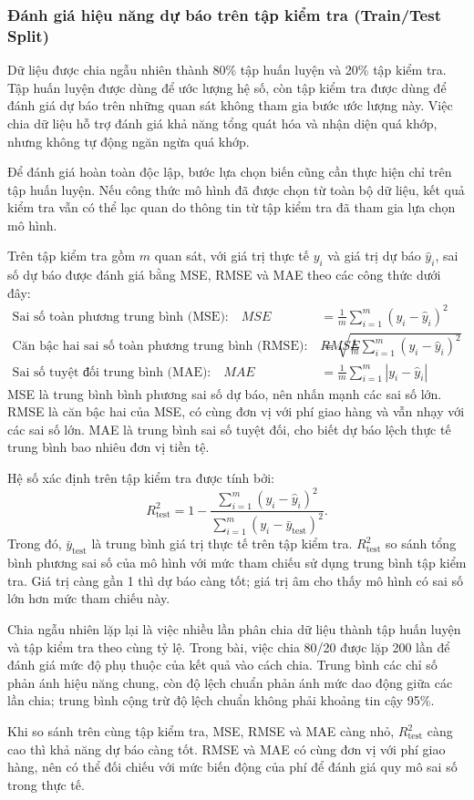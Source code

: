	\subsubsection{Đánh giá hiệu năng dự báo trên tập kiểm tra (Train/Test Split)}
	
	Dữ liệu được chia ngẫu nhiên thành 80\% tập huấn luyện và 20\% tập kiểm tra. Tập huấn luyện được dùng để ước lượng hệ số, còn tập kiểm tra được dùng để đánh giá dự báo trên những quan sát không tham gia bước ước lượng này. Việc chia dữ liệu hỗ trợ đánh giá khả năng tổng quát hóa và nhận diện quá khớp, nhưng không tự động ngăn ngừa quá khớp.
	
	Để đánh giá hoàn toàn độc lập, bước lựa chọn biến cũng cần thực hiện chỉ trên tập huấn luyện. Nếu công thức mô hình đã được chọn từ toàn bộ dữ liệu, kết quả kiểm tra vẫn có thể lạc quan do thông tin từ tập kiểm tra đã tham gia lựa chọn mô hình.
	
	Trên tập kiểm tra gồm $m$ quan sát, với giá trị thực tế $y_i$ và giá trị dự báo $\hat{y}_i$, sai số dự báo được đánh giá bằng MSE, RMSE và MAE theo các công thức dưới đây:
	\begin{align}
		\text{Sai số toàn phương trung bình (MSE):} \quad MSE &= \frac{1}{m} \sum_{i=1}^{m} (y_i - \hat{y}_i)^2 \\
		\text{Căn bậc hai sai số toàn phương trung bình (RMSE):} \quad RMSE &= \sqrt{\frac{1}{m} \sum_{i=1}^{m} (y_i - \hat{y}_i)^2} \\
		\text{Sai số tuyệt đối trung bình (MAE):} \quad MAE &= \frac{1}{m} \sum_{i=1}^{m} |y_i - \hat{y}_i|
	\end{align}
	MSE là trung bình bình phương sai số dự báo, nên nhấn mạnh các sai số lớn. RMSE là căn bậc hai của MSE, có cùng đơn vị với phí giao hàng và vẫn nhạy với các sai số lớn. MAE là trung bình sai số tuyệt đối, cho biết dự báo lệch thực tế trung bình bao nhiêu đơn vị tiền tệ.
	
	Hệ số xác định trên tập kiểm tra được tính bởi:
	\begin{equation*}
		R^2_{\text{test}} = 1 - \frac{\sum_{i=1}^{m}(y_i-\hat{y}_i)^2}{\sum_{i=1}^{m}(y_i-\bar{y}_{\text{test}})^2}.
	\end{equation*}
	Trong đó, $\bar{y}_{\text{test}}$ là trung bình giá trị thực tế trên tập kiểm tra. $R^2_{\text{test}}$ so sánh tổng bình phương sai số của mô hình với mức tham chiếu sử dụng trung bình tập kiểm tra. Giá trị càng gần 1 thì dự báo càng tốt; giá trị âm cho thấy mô hình có sai số lớn hơn mức tham chiếu này.
	
	Chia ngẫu nhiên lặp lại là việc nhiều lần phân chia dữ liệu thành tập huấn luyện và tập kiểm tra theo cùng tỷ lệ. Trong bài, việc chia 80/20 được lặp 200 lần để đánh giá mức độ phụ thuộc của kết quả vào cách chia. Trung bình các chỉ số phản ánh hiệu năng chung, còn độ lệch chuẩn phản ánh mức dao động giữa các lần chia; trung bình cộng trừ độ lệch chuẩn không phải khoảng tin cậy 95\%.
	
	Khi so sánh trên cùng tập kiểm tra, MSE, RMSE và MAE càng nhỏ, $R^2_{\text{test}}$ càng cao thì khả năng dự báo càng tốt. RMSE và MAE có cùng đơn vị với phí giao hàng, nên có thể đối chiếu với mức biến động của phí để đánh giá quy mô sai số trong thực tế.